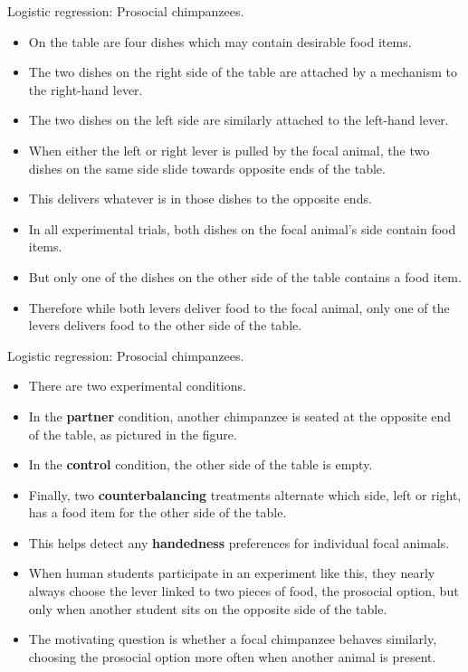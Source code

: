 \documentclass[handout]{beamer}
\begin{document}
\begin{frame}{Logistic regression: Prosocial chimpanzees.}
\scriptsize{
\begin{itemize}

\item On the table are four dishes which may contain desirable food items.
\item The two dishes on the right side of the table are attached by a mechanism to the right-hand lever.
\item The two dishes on the left side are similarly attached to the left-hand lever.
\item When either the left or right lever is pulled by the focal animal, the two dishes on the same side slide towards opposite ends of the table.
\item This delivers whatever is in those dishes to the opposite ends.
\item In all experimental trials, both dishes on the focal animal's side contain
food items.
\item But only one of the dishes on the other side of the table contains a food item.
\item Therefore while both levers deliver food to the focal animal, only one of the levers delivers food to the other side of the table.

\end{itemize}


}

\end{frame}


\begin{frame}{Logistic regression: Prosocial chimpanzees.}
\scriptsize{
\begin{itemize}

\item There are two experimental conditions.
\item In the \textbf{partner} condition, another chimpanzee is seated at the opposite end of the table, as pictured in the figure.
\item In the \textbf{control} condition, the other side of the table is empty. \item Finally, two \textbf{counterbalancing} treatments alternate which side, left or right, has a food item for the other side of the table.
\item This helps detect any \textbf{handedness} preferences for individual focal animals.

\item When human students participate in an experiment like this, they nearly always choose the lever linked to two pieces of food, the prosocial option, but only when another student sits on the opposite side of the table.
\item The motivating question is whether a focal chimpanzee behaves similarly, choosing the prosocial option more often when another animal is present.


\end{itemize}


}

\end{frame}
\end{document}
